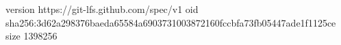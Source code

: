 version https://git-lfs.github.com/spec/v1
oid sha256:3d62a298376baeda65584a6903731003872160fccbfa73fb05447ade1f1125ce
size 1398256
